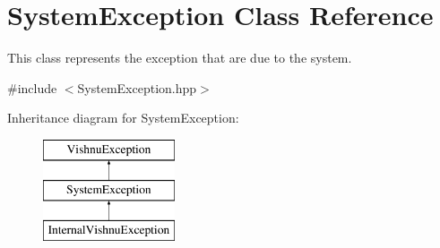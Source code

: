 \hypertarget{classSystemException}{
\section{SystemException Class Reference}
\label{classSystemException}
}


This class represents the exception that are due to the system.  




{\ttfamily \#include $<$SystemException.hpp$>$}

Inheritance diagram for SystemException:\begin{figure}[H]
\begin{center}
\leavevmode
\includegraphics[height=3.000000cm]{classSystemException}
\end{center}
\end{figure}
